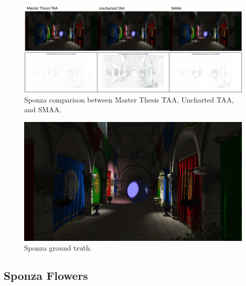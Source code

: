 \documentclass{cslthse-msc}
\begin{document}
\begin{figure}[H]
	\centering
	\includegraphics[scale=0.9]{images/results/sponza.png}
	\caption{Sponza comparison between Master Thesis TAA, Uncharted TAA, and SMAA.}\label{fig:sponza_render}
\end{figure}

\begin{figure}[H]
	\centering
	\includegraphics[scale=0.1]{images/results/sponza_sobel_ground_truth.png}
	\caption{Sponza ground truth.}\label{fig:sponza_truth}
\end{figure}

\subsection{Sponza Flowers}
\end{document}
